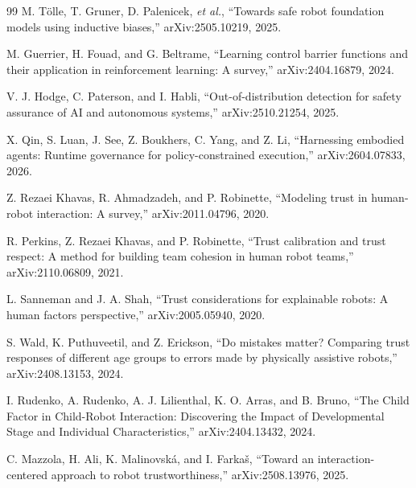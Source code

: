 \documentclass[conference]{IEEEtran}
\begin{document}
\begin{thebibliography}{99}
M. T{\"o}lle, T. Gruner, D. Palenicek, \emph{et al.}, ``Towards safe robot foundation models using inductive biases,'' arXiv:2505.10219, 2025.

M. Guerrier, H. Fouad, and G. Beltrame, ``Learning control barrier functions and their application in reinforcement learning: A survey,'' arXiv:2404.16879, 2024.

V. J. Hodge, C. Paterson, and I. Habli, ``Out-of-distribution detection for safety assurance of AI and autonomous systems,'' arXiv:2510.21254, 2025.

X. Qin, S. Luan, J. See, Z. Boukhers, C. Yang, and Z. Li, ``Harnessing embodied agents: Runtime governance for policy-constrained execution,'' arXiv:2604.07833, 2026.

Z. Rezaei Khavas, R. Ahmadzadeh, and P. Robinette, ``Modeling trust in human-robot interaction: A survey,'' arXiv:2011.04796, 2020.

R. Perkins, Z. Rezaei Khavas, and P. Robinette, ``Trust calibration and trust respect: A method for building team cohesion in human robot teams,'' arXiv:2110.06809, 2021.

L. Sanneman and J. A. Shah, ``Trust considerations for explainable robots: A human factors perspective,'' arXiv:2005.05940, 2020.

S. Wald, K. Puthuveetil, and Z. Erickson, ``Do mistakes matter? Comparing trust responses of different age groups to errors made by physically assistive robots,'' arXiv:2408.13153, 2024.

I. Rudenko, A. Rudenko, A. J. Lilienthal, K. O. Arras, and B. Bruno, ``The Child Factor in Child-Robot Interaction: Discovering the Impact of Developmental Stage and Individual Characteristics,'' arXiv:2404.13432, 2024.

C. Mazzola, H. Ali, K. Malinovsk{\'a}, and I. Farka{\v{s}}, ``Toward an interaction-centered approach to robot trustworthiness,'' arXiv:2508.13976, 2025.

\end{thebibliography}
\end{document}

